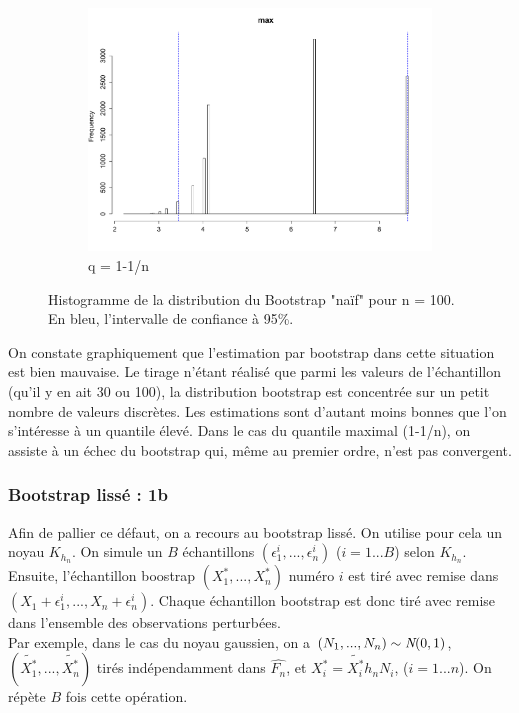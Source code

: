 \documentclass{article}
\renewcommand*{\(}{\left(}
\renewcommand*{\)}{\right)}
\begin{document}
\begin{figure}[H]
\begin{subfigure}[b]{0.3\textwidth}
        \includegraphics[width = \linewidth]{img/BootstrapNaif-Max-100.pdf}
        \caption{q = 1-1/n}
        \label{fig:naifcBMax}
    \end{subfigure}%
    \caption{Histogramme de la distribution du Bootstrap "naïf" pour n = 100. En bleu, l'intervalle de confiance à 95\%.}
    \label{fig:naifB100}
\end{figure}

On constate graphiquement que l'estimation par bootstrap dans cette situation est bien mauvaise. Le tirage n'étant réalisé que parmi les valeurs de l'échantillon (qu'il y en ait 30 ou 100), la distribution bootstrap est concentrée sur un petit nombre de valeurs discrètes. Les estimations sont d'autant moins bonnes que l'on s'intéresse à un quantile élevé. Dans le cas du quantile maximal (1-1/n), on assiste à un échec du bootstrap qui, même au premier ordre, n'est pas convergent.

\subsubsection{Bootstrap lissé : 1b}
Afin de pallier ce défaut, on a recours au bootstrap lissé. On utilise pour cela un noyau $K_{h_n}$. On simule un $B$ échantillons $(\epsilon^{i}_1, ..., \epsilon^{i}_n)$ ($i=1...B$) selon $K_{h_n}$. Ensuite, l'échantillon boostrap $(X^*_1, ..., X^*_n)$ numéro $i$ est tiré avec remise dans $(X_1+\epsilon^{i}_1, ...,X_n+ \epsilon^{i}_n)$. Chaque échantillon bootstrap est donc tiré avec remise dans l'ensemble des observations perturbées.\\

Par exemple, dans le cas du noyau gaussien, on a $(N_1, ...,N_n) \sim \emph{N}(0,1)$, $(\tilde{X^*_1},...,\tilde{X^*_n})$ tirés indépendamment dans $\hat{F_n}$, et $X_i^* = \tilde{X^*_i}h_nN_i$, ($i=1...n$). On répète $B$ fois cette opération.\\
\end{document}
